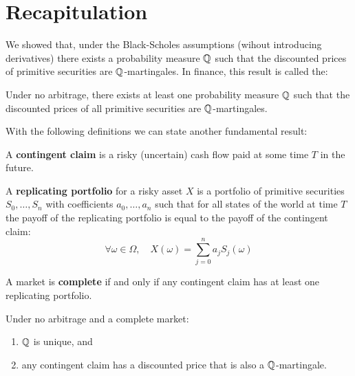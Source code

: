 \documentclass[11pt]{article}
\date{Lecture 2 (15 Jan. 2013)}
\begin{document}
{\small \maketitle}

\section{Recapitulation}

We showed that, under the Black-Scholes assumptions (wihout introducing derivatives) there exists a probability measure $\operatorname{\mathbb Q}$ such that the discounted prices of primitive securities are $\operatorname{\mathbb Q}$-martingales. In finance, this result is called the:

\begin{theorem} Under no arbitrage, there exists at least one probability measure $\operatorname{\mathbb Q}$ such that the discounted prices of all primitive securities are $\operatorname{\mathbb Q}$-martingales.
\end{theorem}

With the following definitions we can state another fundamental result:

\begin{definition}
A {\bf contingent claim} is a risky (uncertain) cash flow paid at some time $T$ in the future.
\end{definition}

\begin{definition}
A {\bf replicating portfolio} for a risky asset $X$ is a portfolio of primitive securities $S_0,\dotsc,S_n$ with coefficients $a_0,\dotsc,a_n$ such that for all states of the world at time $T$ the payoff of the replicating portfolio is equal to the payoff of the contingent claim:
$$ \forall \omega \in \Omega, \quad X(\omega) = \sum_{j=0}^n a_j S_j(\omega)$$
\end{definition}

\begin{definition}
A market is {\bf complete} if and only if any contingent claim has at least one replicating portfolio.
\end{definition}

\begin{theorem} Under no arbitrage and a complete market:
\begin{enumerate}
\item $\operatorname{\mathbb Q}$ is unique, and
\item any contingent claim has a discounted price that is also a $\operatorname{\mathbb Q}$-martingale.
\end{enumerate}
\end{theorem}
\end{document}
